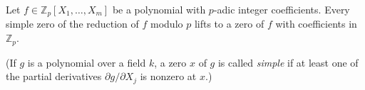 Let $f \in \mathbb{Z}_p[X_1, \ldots, X_m]$ be a polynomial with $p$-adic integer coefficients. Every simple zero of the reduction of $f$ modulo $p$ lifts to a zero of $f$ with coefficients in $\mathbb{Z}_p$.

(If $g$ is a polynomial over a field $k$, a zero $x$ of $g$ is called \textit{simple} if at least one of the partial derivatives $\partial g / \partial X_j$ is nonzero at $x$.)
